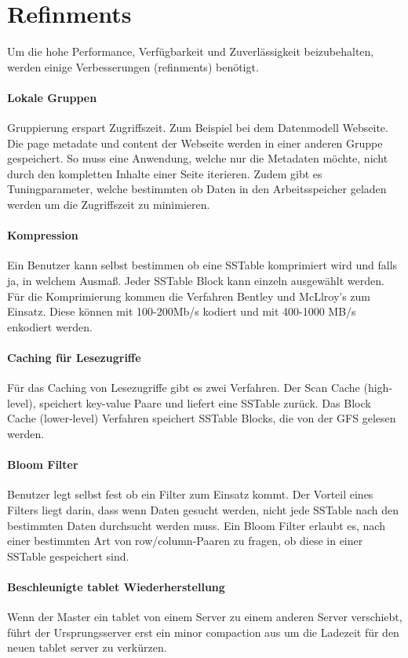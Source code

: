 \section{Refinments}
Um die hohe Performance, Verfügbarkeit und Zuverlässigkeit beizubehalten, werden einige Verbesserungen (refinments) benötigt.

\paragraph{Lokale Gruppen}
Gruppierung erspart Zugriffszeit. Zum Beispiel bei dem Datenmodell Webseite. Die \glqq page metadate \grqq und \glqq content \grqq der Webseite werden in einer anderen Gruppe gespeichert. So muss eine Anwendung, welche nur die Metadaten möchte, nicht durch den kompletten Inhalte einer Seite iterieren.
Zudem gibt es Tuningparameter, welche bestimmten ob Daten in den Arbeitsspeicher geladen werden um die Zugriffszeit zu minimieren.

\paragraph{Kompression}
Ein Benutzer kann selbst bestimmen ob eine SSTable komprimiert wird und falls ja, in welchem Ausmaß. Jeder SSTable Block kann einzeln ausgewählt werden. Für die Komprimierung kommen die  Verfahren Bentley und McLlroy’s zum Einsatz. Diese können mit 100-200Mb/s kodiert und mit 400-1000 MB/s enkodiert werden.

\paragraph{Caching für Lesezugriffe}
Für das Caching von Lesezugriffe gibt es zwei Verfahren. Der Scan Cache (high-level), speichert key-value Paare und liefert eine SSTable zurück. Das Block Cache (lower-level) Verfahren speichert SSTable Blocks, die von der GFS gelesen werden.

\paragraph{Bloom Filter}
Benutzer legt selbst fest ob ein Filter zum Einsatz kommt. Der Vorteil eines Filters liegt darin, dass wenn Daten gesucht werden, nicht jede SSTable nach den bestimmten Daten durchsucht werden muss. Ein Bloom Filter erlaubt es, nach einer bestimmten Art von row/column-Paaren zu fragen, ob diese in einer SSTable gespeichert sind.

\paragraph{Beschleunigte tablet Wiederherstellung}
Wenn der Master ein tablet von einem Server zu einem anderen Server verschiebt, führt der Ursprungsserver erst ein \glqq minor compaction \grqq aus um die Ladezeit für den neuen tablet server zu verkürzen.

